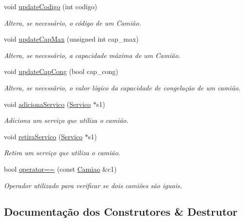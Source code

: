 \begin{DoxyCompactItemize}
void \hyperlink{class_camiao_a4f988acfcd16392ca0b104eae046fcc3}{update\+Codigo} (int codigo)
\begin{DoxyCompactList}\small\item\em Altera, se necessário, o código de um Camião. \end{DoxyCompactList}\item 
void \hyperlink{class_camiao_a1969f708e4055e48b27b0f727a985fb4}{update\+Cap\+Max} (unsigned int cap\+\_\+max)
\begin{DoxyCompactList}\small\item\em Altera, se necessário, a capacidade máxima de um Camião. \end{DoxyCompactList}\item 
void \hyperlink{class_camiao_a4bc98b0b67a9189f0f01ef1cbb06db23}{update\+Cap\+Cong} (bool cap\+\_\+cong)
\begin{DoxyCompactList}\small\item\em Altera, se necessário, o valor lógico da capacidade de congelação de um camião. \end{DoxyCompactList}\item 
void \hyperlink{class_camiao_afba93eb174b4708bd6a060193c116055}{adiciona\+Servico} (\hyperlink{class_servico}{Servico} $\ast$s1)
\begin{DoxyCompactList}\small\item\em Adiciona um serviço que utiliza o camião. \end{DoxyCompactList}\item 
void \hyperlink{class_camiao_a98fc9d0557379100c5c8483347aef88b}{retira\+Servico} (\hyperlink{class_servico}{Servico} $\ast$s1)
\begin{DoxyCompactList}\small\item\em Retira um serviço que utiliza o camião. \end{DoxyCompactList}\item 
bool \hyperlink{class_camiao_a2e09163befe964a586485ef4e3b180bd}{operator==} (const \hyperlink{class_camiao}{Camiao} \&c1)
\begin{DoxyCompactList}\small\item\em Operador utilizado para verificar se dois camiões são iguais. \end{DoxyCompactList}\end{DoxyCompactItemize}


\subsection{Documentação dos Construtores \& Destrutor}
\hypertarget{class_camiao_a9dbe2b8fd232262b23cb7817634ec9f2}{}
